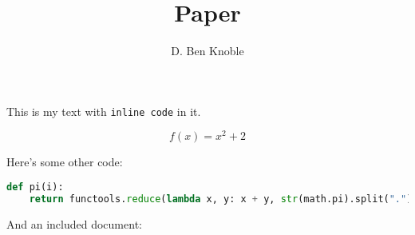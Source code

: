 \documentclass{article}
\begin{document}
\title{Paper}
\author{D. Ben Knoble}
\maketitle

This is my text with \lstinline:inline code: in it.

\begin{equation}
    f(x) = x^2 + 2
\end{equation}

Here's some other code:

\begin{lstlisting}[language=Python]
def pi(i):
    return functools.reduce(lambda x, y: x + y, str(math.pi).split("."))[i]
\end{lstlisting}

And an included document:


\end{document}
